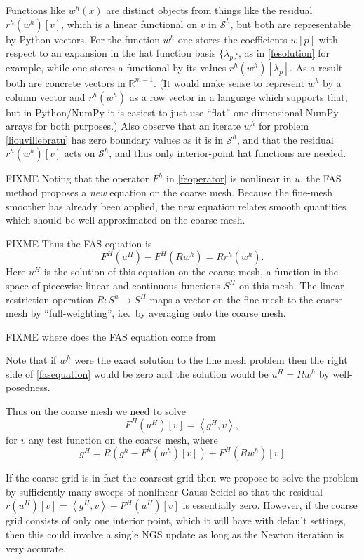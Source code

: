 \documentclass[letterpaper,final,12pt,reqno]{amsart}
\newcommand{\RR}{\mathbb{R}}
\newcommand{\ip}[2]{\left<#1,#2\right>}
\begin{document}
Functions like $w^h(x)$ are distinct objects from things like the residual $r^h(w^h)[v]$, which is a linear functional on $v$ in $\mathcal{S}^h$, but both are representable by Python vectors.  For the function $w^h$ one stores the coefficients $w[p]$ with respect to an expansion in the hat function basis $\{\lambda_p\}$, as in \eqref{fesolution} for example, while one stores a functional by its values $r^h(w^h)[\lambda_p]$.  As a result both are concrete vectors in $\RR^{m-1}$.  (It would make sense to represent $w^h$ by a column vector and $r^h(w^h)$ as a row vector in a language which supports that, but in Python/NumPy it is easiest to just use ``flat'' one-dimensional NumPy arrays for both purposes.)   Also observe that an iterate $w^h$ for problem \eqref{liouvillebratu} has zero boundary values as it is in $\mathcal{S}^h$, and that the residual $r^h(w^h)[v]$ acts on $\mathcal{S}^h$, and thus only interior-point hat functions are needed.

FIXME Noting that the operator $F^h$ in \eqref{feoperator} is nonlinear in $u$, the FAS method  proposes a \emph{new} equation on the coarse mesh.  Because the fine-mesh smoother has already been applied, the new equation relates smooth quantities which should be well-approximated on the coarse mesh.  

FIXME Thus the FAS equation is
\begin{equation}
  F^H(u^H) - F^H(R w^h) = R r^h(w^h). \label{fasequation}
\end{equation}
Here $u^H$ is the solution of this equation on the coarse mesh, a function in the space of piecewise-linear and continuous functions $S^H$ on this mesh.  The linear restriction operation $R:S^h \to S^H$ maps a vector on the fine mesh to the coarse mesh by ``full-weighting'', i.e.~by averaging onto the coarse mesh.

FIXME where does the FAS equation come from

Note that if $w^h$ were the exact solution to the fine mesh problem then the right side of \eqref{fasequation} would be zero and the solution would be $u^H = R w^h$ by well-posedness.

Thus on the coarse mesh we need to solve
\begin{equation}
  F^H(u^H)[v] = \ip{g^H}{v},  \label{weakformcoarse}
\end{equation}
for $v$ any test function on the coarse mesh, where
  $$g^H = R (g^h - F^h(w^h)[v]) + F^H(R w^h)[v]$$

If the coarse grid is in fact the coarsest grid then we propose to solve the problem by sufficiently many sweeps of nonlinear Gauss-Seidel so that the residual $r(u^H)[v] = \ip{g^H}{v} - F^H(u^H)[v]$ is essentially zero.  However, if the coarse grid consists of only one interior point, which it will have with default settings, then this could involve a single NGS update as long as the Newton iteration is very accurate.
\end{document}

